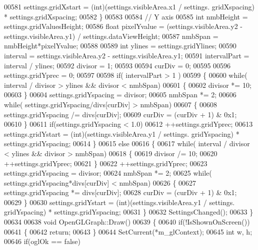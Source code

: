 \begin{DoxyCode}
{{{{{{{{00581         settings.gridXstart = (int)(settings.visibleArea.x1 / settings.
      gridXspacing) * settings.gridXspacing;
00582     \}
00583 
00584     \textcolor{comment}{// Y axis}
00585     \textcolor{keywordtype}{int} nmbHeight = settings.gridValuesHeight;
00586     \textcolor{keywordtype}{float} pixelYvalue = (settings.visibleArea.y2 - settings.visibleArea.y1) / 
      settings.dataViewHeight;
00587     nmbSpan = nmbHeight*pixelYvalue;
00588 
00589     \textcolor{keywordtype}{int} ylines = settings.gridYlines;
00590     interval = settings.visibleArea.y2 - settings.visibleArea.y1;
00591     intervalPart = interval / ylines;
00592     divisor = 1;
00593 
00594     curDiv = 0;
00595 
00596     settings.gridYprec = 0;
00597 
00598     \textcolor{keywordflow}{if}( intervalPart > 1 )
00599     \{
00600         \textcolor{keywordflow}{while}( interval / divisor > ylines && divisor < nmbSpan)
00601         \{
00602             divisor *= 10;
00603         \}
00604         settings.gridYspacing = divisor;
00605         nmbSpan *= 2;
00606         \textcolor{keywordflow}{while}( settings.gridYspacing/divs[curDiv] > nmbSpan)
00607         \{
00608             settings.gridYspacing /= divs[curDiv];
00609             curDiv = (curDiv + 1) & 0x1;
00610         \}
00611         \textcolor{keywordflow}{if}(settings.gridYspacing < 1.0)
00612             ++settings.gridYprec;
00613         settings.gridYstart = (int)(settings.visibleArea.y1 / settings.
      gridYspacing) * settings.gridYspacing;
00614     \}
00615     \textcolor{keywordflow}{else}
00616     \{
00617         \textcolor{keywordflow}{while}( interval / divisor < ylines && divisor > nmbSpan)
00618         \{
00619             divisor /= 10;
00620             ++settings.gridYprec;
00621         \}
00622         ++settings.gridYprec;
00623         settings.gridYspacing = divisor;
00624         nmbSpan *= 2;
00625         \textcolor{keywordflow}{while}( settings.gridYspacing*divs[curDiv] < nmbSpan)
00626         \{
00627             settings.gridYspacing *= divs[curDiv];
00628             curDiv = (curDiv + 1) & 0x1;
00629         \}
00630         settings.gridYstart = (int)(settings.visibleArea.y1 / settings.
      gridYspacing) * settings.gridYspacing;
00631     \}
00632     SettingsChanged();
00633 \}
00634 
00638 \textcolor{keywordtype}{void} OpenGLGraph::Draw()
00639 \{
00640     \textcolor{keywordflow}{if}(!IsShownOnScreen())
00641     \{
00642         \textcolor{keywordflow}{return};
00643     \}
00644     SetCurrent(*m_glContext);
00645     \textcolor{keywordtype}{int} w, h;
00646     \textcolor{keywordflow}{if}(oglOk == \textcolor{keyword}{false})
}}}}}}}}
\end{DoxyCode}
